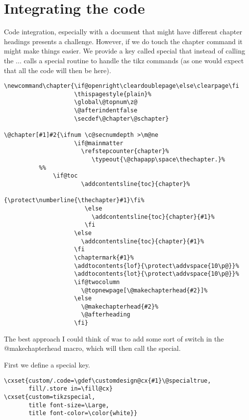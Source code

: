 \section{Integrating the code}

Code integration, especially with a document that might have different chapter headings presents a challenge. However, if we do touch the chapter command it might make things easier. We provide a key called special that instead of calling the \string\@make... calls a special
routine to handle the tikz commands (as one would expect that all the code will then be here).

\begin{lstlisting}
\newcommand\chapter{\if@openright\cleardoublepage\else\clearpage\fi
                    \thispagestyle{plain}%
                    \global\@topnum\z@
                    \@afterindentfalse
                    \secdef\@chapter\@schapter}

\@chapter[#1]#2{\ifnum \c@secnumdepth >\m@ne
                    \if@mainmatter
                      \refstepcounter{chapter}%
                         \typeout{\@chapapp\space\thechapter.}%
          %%
              \if@toc
                      \addcontentsline{toc}{chapter}%
                                   {\protect\numberline{\thechapter}#1}\fi%
                       \else
                         \addcontentsline{toc}{chapter}{#1}%
                       \fi
                    \else
                      \addcontentsline{toc}{chapter}{#1}%
                    \fi
                    \chaptermark{#1}%
                    \addtocontents{lof}{\protect\addvspace{10\p@}}%
                    \addtocontents{lot}{\protect\addvspace{10\p@}}%
                    \if@twocolumn
                      \@topnewpage[\@makechapterhead{#2}]%
                    \else
                      \@makechapterhead{#2}%
                      \@afterheading
                    \fi}
\end{lstlisting}

The best approach I could think of was to add some sort of switch in
the @makechapterhead macro, which will then call the special.

First we define a special key.


\begin{lstlisting}
\cxset{custom/.code=\gdef\customdesign@cx{#1}\@specialtrue,
       fill/.store in=\fill@cx}
\cxset{custom=tikzspecial,
       title font-size=\Large,
       title font-color=\color{white}}
\end{lstlisting}

